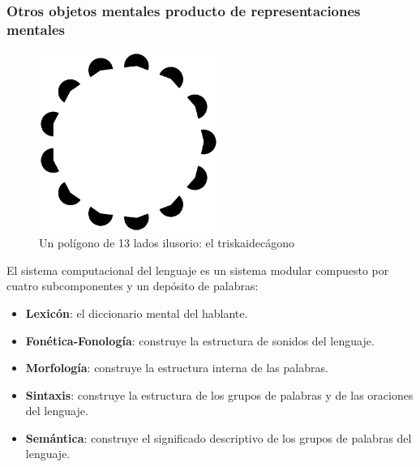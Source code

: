 \documentclass[compress]{beamer}
\begin{document}
	
	\begin{frame}
		\frametitle{Otros objetos mentales producto de representaciones mentales}
		\begin{figure}[H]
		\begin{center}
		  \includegraphics[width=2.3in]{images/13sided.eps}
		\end{center}
		\caption{Un polígono de 13 lados ilusorio: el triskaidecágono}\label{ilusiontrisk}
		\end{figure}
	\end{frame}	

\begin{frame}
	El sistema computacional del lenguaje es un sistema modular compuesto por cuatro subcomponentes y un depósito de palabras:
	\begin{itemize}
		\item \textbf{Lexicón}: el diccionario mental del hablante.
		\item \textbf{Fonética-Fonología}: construye la estructura de sonidos del lenguaje.
		\item \textbf{Morfología}: construye la estructura interna de las palabras.
		\item \textbf{Sintaxis}: construye la estructura de los grupos de palabras y de las oraciones del lenguaje.
		\item \textbf{Semántica}: construye el significado descriptivo de los grupos de palabras del lenguaje. 
	\end{itemize}
\end{frame}
\end{document}

